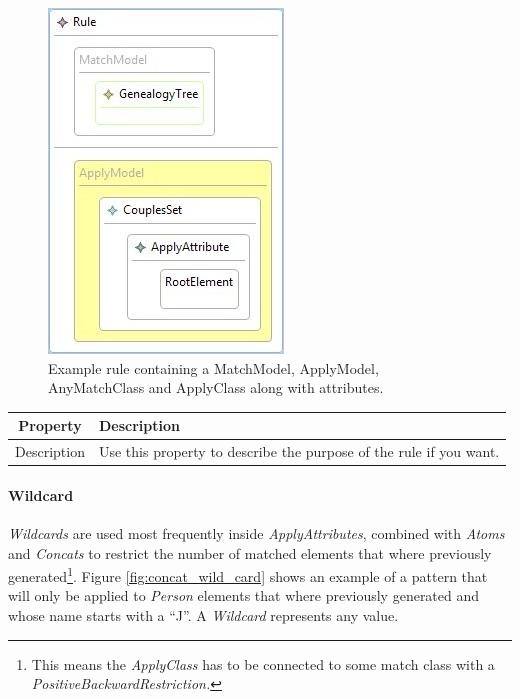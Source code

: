 \begin{figure}[h]
\begin{center}
  \includegraphics[scale=0.7]{imgs/rule_example.jpg}
  \caption{Example rule containing a MatchModel, ApplyModel, AnyMatchClass and
  ApplyClass along with attributes.}
  \label{fig:rule_example}
\end{center}
\end{figure}


\begin{center}
  \begin{tabular}{ | c | p{\paragraphsize} | }
    \hline
    \textbf{Property} & \textbf{Description} \\ \hline
    Description & Use this property to describe the purpose of the
  rule if you want.  \\
    \hline
  \end{tabular}
\end{center}


\paragraph{Wildcard}

\emph{Wildcards} are used most frequently inside \emph{ApplyAttributes},
combined with \emph{Atoms} and \emph{Concats} to restrict the number of matched
elements that where previously generated\footnote{This means the
\emph{ApplyClass} has to be connected to some match class with a
\emph{PositiveBackwardRestriction.}}. Figure \ref{fig:concat_wild_card} shows an
example of a pattern that will only be applied to \emph{Person} elements that
where previously generated and whose name starts with a ``J''. A \emph{Wildcard}
represents any value.

